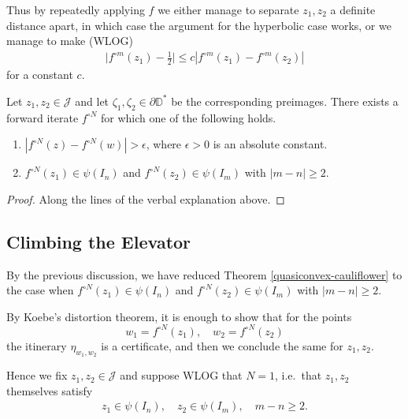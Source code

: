 Thus by repeatedly applying $f$ we either manage to separate $z_1,z_2$ a definite distance apart, in which case the argument for the hyperbolic case works, or we manage to make (WLOG) 
\begin{align*}
\big|f^{\circ m} (z_1)-\frac 12\big| \leq c |f^{\circ m} (z_1)-f^{\circ m} (z_2)|
\end{align*}
for a constant $c$.

\begin{theorem}
	Let $z_1,z_2 \in \mathcal J$ and let $\zeta_1,\zeta_2\in \partial \mathbb D^*$ be the corresponding preimages. 
	 There exists a forward iterate	$f^{\circ N}$ for which one of the following holds.
	\begin{enumerate}[label=(\roman*)]
		\item $\left|f^{\circ N}(z)-f^{\circ N}(w)\right|>\epsilon$, where $\epsilon>0$ is an absolute constant.
		
		\item $f^{\circ N }(z_1) \in \psi(I_n)$ and $f^{\circ N }(z_2) \in \psi(I_m)$ with $|m-n| \geq 2$.
	\end{enumerate}
	
\end{theorem}

\begin{proof}
	Along the lines of the verbal explanation above.
\end{proof}

\subsection{Climbing the Elevator}
By the previous discussion, we have reduced Theorem \ref{quasiconvex-cauliflower} to the case when $f^{\circ N }(z_1) \in \psi(I_n)$ and $f^{\circ N}(z_2) \in \psi(I_m)$ with $|m-n| \geq 2$.

By Koebe's distortion theorem, it is enough to show that for the points $$w_1=f^{\circ N }(z_1),\quad w_2=f^{\circ N }(z_2)$$ the itinerary $\eta_{w_1,w_2}$ is a certificate, and then we conclude the same for $z_1,z_2$. 

Hence we fix $z_1,z_2 \in \mathcal J$ and suppose WLOG that $N=1$, i.e.\ that $z_1,z_2$ themselves satisfy 
\begin{align} \label{parabolic separation}
	z_1 \in \psi(I_n), \quad z_2 \in \psi(I_m), \quad m-n \geq 2.
\end{align}

